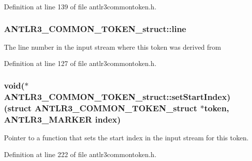 Definition at line 139 of file antlr3commontoken.\-h.

\hypertarget{struct_a_n_t_l_r3___c_o_m_m_o_n___t_o_k_e_n__struct_aa4541ade0791f2ef3b48004bb4e17ac8}{
\subsubsection[{line}]{ A\-N\-T\-L\-R3\-\_\-\-C\-O\-M\-M\-O\-N\-\_\-\-T\-O\-K\-E\-N\-\_\-struct\-::line}}\label{struct_a_n_t_l_r3___c_o_m_m_o_n___t_o_k_e_n__struct_aa4541ade0791f2ef3b48004bb4e17ac8}
The line number in the input stream where this token was derived from 

Definition at line 127 of file antlr3commontoken.\-h.

\hypertarget{struct_a_n_t_l_r3___c_o_m_m_o_n___t_o_k_e_n__struct_a768d81d983b00d15fb177bbf4b0e52a0}{
\subsubsection[{set\-Start\-Index}]{\setlength{\rightskip}{0pt plus 5cm}void($\ast$ A\-N\-T\-L\-R3\-\_\-\-C\-O\-M\-M\-O\-N\-\_\-\-T\-O\-K\-E\-N\-\_\-struct\-::set\-Start\-Index)(struct {\bf A\-N\-T\-L\-R3\-\_\-\-C\-O\-M\-M\-O\-N\-\_\-\-T\-O\-K\-E\-N\-\_\-struct} $\ast$token, {\bf A\-N\-T\-L\-R3\-\_\-\-M\-A\-R\-K\-E\-R} {\bf index})}}\label{struct_a_n_t_l_r3___c_o_m_m_o_n___t_o_k_e_n__struct_a768d81d983b00d15fb177bbf4b0e52a0}
Pointer to a function that sets the start index in the input stream for this token. 

Definition at line 222 of file antlr3commontoken.\-h.


